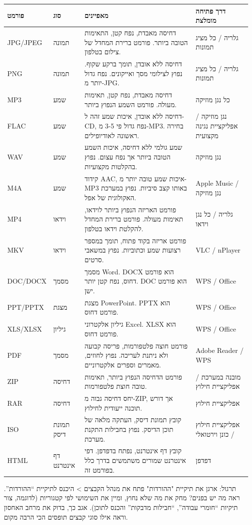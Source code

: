 \begin{center}
\begin{tabularx}{\linewidth}{|X|X|X|X|}
\hline
\textbf{פורמט} & \textbf{סוג} & \textbf{מאפיינים} & \textbf{דרך פתיחה מומלצת} \tabularnewline
\hline
JPG/JPEG & תמונה & דחיסה מאבדת, נפח קטן, התאימות הטובה ביותר. פורמט ברירת המחדל של צילום בטלפון. & גלריה / כל מציג תמונות \tabularnewline
PNG & תמונה & דחיסה ללא אובדן, תומך ברקע שקוף. נפוץ לצילומי מסך ואייקונים. נפח גדול יותר מ-JPG. & גלריה / כל מציג תמונות \tabularnewline
MP3 & שמע & דחיסה מאבדת, נפח קטן, תאימות מעולה. פורמט השמע הנפוץ ביותר. & כל נגן מוזיקה \tabularnewline
FLAC & שמע & דחיסה ללא אובדן, איכות שמע זהה ל-CD, נפח גדול פי 3-5 מ-MP3. בחירה ראשונה לאודיופילים. & נגן מוזיקה / אפליקציית נגינה מקצועית \tabularnewline
WAV & שמע & שמע גולמי ללא דחיסה, איכות השמע הטובה ביותר אך נפח עצום. נפוץ בהקלטות מקצועיות. & נגן מוזיקה \tabularnewline
M4A & שמע & קידוד AAC, איכות שמע טובה יותר מ-MP3 באותו קצב סיביות. נפוץ במערכת האקולוגית של אפל. & Apple Music / נגן מוזיקה \tabularnewline
MP4 & וידאו & פורמט האריזה הנפוץ ביותר לוידאו, תאימות מעולה. פורמט ברירת המחדל להקלטת וידאו בטלפון. & גלריה / כל נגן וידאו \tabularnewline
MKV & וידאו & פורמט אריזה בקוד פתוח, תומך במספר רצועות שמע וכתוביות. נפוץ במשאבי סרטים. & VLC / nPlayer \tabularnewline
DOC/DOCX & מסמך & מסמך Word. DOCX הוא פורמט דחוס, נפח קטן יותר. DOC הוא פורמט ישן. & WPS / Office \tabularnewline
PPT/PPTX & מצגת & מצגת PowerPoint. PPTX הוא פורמט דחוס. & WPS / Office \tabularnewline
XLS/XLSX & גיליון & גיליון אלקטרוני Excel. XLSX הוא פורמט דחוס. & WPS / Office \tabularnewline
PDF & מסמך & פורמט חוצה פלטפורמות, פריסה קבועה ולא ניתנת לעריכה. נפוץ לחוזים, מאמרים וספרים אלקטרוניים. & Adobe Reader / WPS \tabularnewline
ZIP & דחיסה & פורמט הדחיסה הנפוץ ביותר, תאימות טובה חוצת פלטפורמות. & מובנה במערכת / אפליקציית חילוץ \tabularnewline
RAR & דחיסה & יחס דחיסה גבוה מ-ZIP, אך דורש תוכנה ייעודית לחילוץ. & אפליקציית חילוץ \tabularnewline
ISO & תמונת דיסק & קובץ תמונת דיסק, העתקה מלאה של תוכן הדיסק. נפוץ בחבילות התקנת מערכת. & אפליקציית חילוץ / כונן וירטואלי \tabularnewline
HTML & דף אינטרנט & קובץ דף אינטרנט, נפתח בדפדפן. דפי אינטרנט שמורים משתמשים בדרך כלל בפורמט זה. & דפדפן \tabularnewline
\hline
\end{tabularx}
\end{center}

\begin{tcbpractice}{תרגול: ארגן את תיקיית "ההורדות"}
פתח את מנהל הקבצים > היכנס לתיקיית “ההורדות”. ראה מה יש בפנים? מחק את מה שלא נחוץ, ומיין את השימושי לפי קטגוריות (לדוגמה, צור תיקיות “חומרי עבודה”, “חבילות מדבקות” והכנס לתוכן). אגב כך, בדוק את מרחב האחסון וראה אילו סוגי קבצים תופסים הכי הרבה מקום.

\end{tcbpractice}


